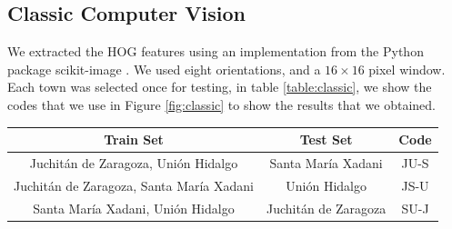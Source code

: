 \subsection{Classic Computer Vision}

We extracted the HOG features using an implementation from the Python package scikit-image \cite{scikit-learn}. We used eight orientations, and a $16\times16$ pixel window. Each town was selected once for testing, in table \ref{table:classic}, we show the codes that we use in Figure \ref{fig:classic} to show the results that we obtained.\\


\begin{center}
  \begin{tabular}{|c|c|c|}
    \hline
    Train Set                                      &Test Set               &Code \\ \hline
    Juchit\'an de Zaragoza, Uni\'on Hidalgo        &Santa Mar\'ia Xadani   &JU-S \\ \hline
    Juchit\'an de Zaragoza, Santa Mar\'ia Xadani   &Uni\'on Hidalgo        &JS-U \\ \hline
    Santa Mar\'ia Xadani, Uni\'on Hidalgo          &Juchit\'an de Zaragoza &SU-J \\ 
    \hline
  \end{tabular}
  \label{table:classic}
\end{center}

